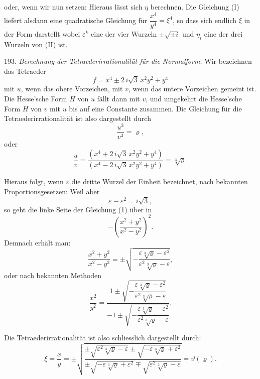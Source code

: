 oder, wenn wir nun
setzen:
Hieraus lässt sich $\eta$ berechnen. Die Gleichung (I) liefert alsdann eine quadratische Gleichung für $\dfrac{x^4}{y^4}=\xi^4$, so dass sich endlich $\xi$ in der Form darstellt
wobei $\varepsilon^k$ eine der vier Wurzeln $\pm\sqrt{\pm i}$ und $\eta_i$ eine der drei Wurzeln von (II) ist.

193. \textit{Berechnung der Tetraederirrationalität für die Normalform.} Wir bezeichnen das Tetraeder
\[
f=x^4\pm 2\,i\sqrt{3}\,x^2y^2+y^4
\]
mit $u$, wenn das obere Vorzeichen, mit $v$, wenn das untere Vorzeichen gemeint ist. Die Hesse'sche Form $H$ von $u$ fällt dann mit $v$, und umgekehrt die Hesse'sche Form $H$ von $v$ mit $u$ bis auf eine Constante zusammen. Die Gleichung für die Tetraederirrationalität ist also dargestellt durch
\[
\frac{u^3}{v^3}=\varrho,
\]
oder
\[
\frac{u}{v}=\frac{(x^4+2\,i\sqrt{3}\,x^2y^2+y^4)}{(x^4-2\,i\sqrt{3}\,x^2y^2+y^4)}=\sqrt[3]{\varrho}.
\]

Hieraus folgt, wenn $\varepsilon$ die dritte Wurzel der Einheit bezeichnet, nach bekannten Proportionsgesetzen:
Weil aber
\[
\varepsilon-\varepsilon^2=i\sqrt{3},
\]
so geht die linke Seite der Gleichung (1) über in
\[
-\left(\frac{x^2+y^2}{x^2-y^2}\right)^2.
\]
Demnach erhält man:
\[
\frac{x^2+y^2}{x^2-y^2}=\pm\sqrt{-\frac{\varepsilon\sqrt[3]{\varrho}-\varepsilon^2}{\varepsilon^2\sqrt[3]{\varrho}-\varepsilon}},
\]
oder nach bekannten Methoden
\[
\frac{x^2}{y^2}=\frac{1\pm\sqrt{-\dfrac{\varepsilon\sqrt[3]{\varrho}-\varepsilon^2}{\varepsilon^2\sqrt[3]{\varrho}-\varepsilon}}}{-1\pm\sqrt{-\dfrac{\varepsilon\sqrt[3]{\varrho}-\varepsilon^2}{\varepsilon^2\sqrt[3]{\varrho}-\varepsilon}}}.
\]


Die Tetraederirrationalität ist also schliesslich dargestellt durch:
\[
\xi=\frac{x}{y}=\pm\sqrt{\frac{\pm\sqrt{\varepsilon^2\sqrt[3]{\varrho}-\varepsilon}\pm\sqrt{-\varepsilon\sqrt[3]{\varrho}+\varepsilon^2}}{\pm\sqrt{-\varepsilon\sqrt[3]{\varrho}+\varepsilon^2}\mp\sqrt{\varepsilon^2\sqrt[3]{\varrho}-\varepsilon}}}=\vartheta(\varrho). %
\]

